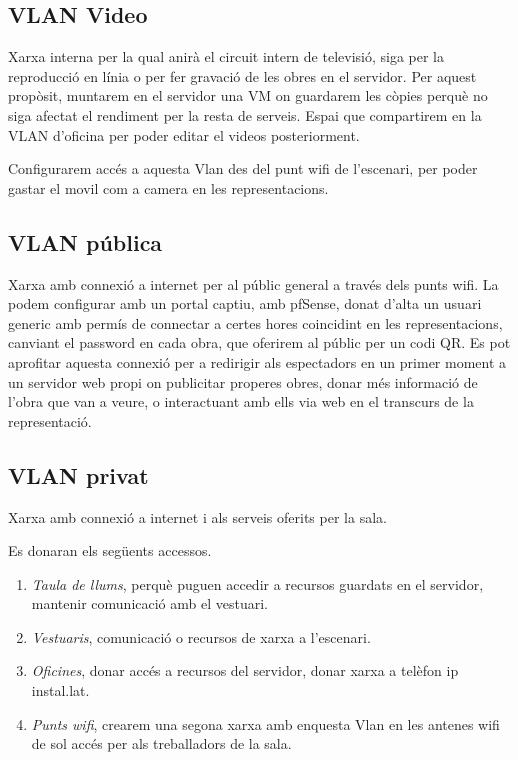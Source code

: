 \documentclass[
  10pt,
]{krantz}
\begin{document}
\hypertarget{vlan-video}{%
\subsection{VLAN Video}\label{vlan-video}}

Xarxa interna per la qual anirà el circuit intern de televisió, siga per la reproducció en línia o per fer gravació de les obres en el servidor. Per aquest propòsit, muntarem en el servidor una VM on guardarem les còpies perquè no siga afectat el rendiment per la resta de serveis. Espai que compartirem en la VLAN d'oficina per poder editar el videos posteriorment.

Configurarem accés a aquesta Vlan des del punt wifi de l'escenari, per poder gastar el movil com a camera en les representacions.

\hypertarget{vlan-puxfablica}{%
\subsection{VLAN pública}\label{vlan-puxfablica}}

Xarxa amb connexió a internet per al públic general a través dels punts wifi. La podem configurar amb un portal captiu, amb pfSense, donat d'alta un usuari generic amb permís de connectar a certes hores coincidint en les representacions, canviant el password en cada obra, que oferirem al públic per un codi QR. Es pot aprofitar aquesta connexió per a redirigir als espectadors en un primer moment a un servidor web propi on publicitar properes obres, donar més informació de l'obra que van a veure, o interactuant amb ells via web en el transcurs de la representació.

\hypertarget{vlan-privat}{%
\subsection{VLAN privat}\label{vlan-privat}}

Xarxa amb connexió a internet i als serveis oferits per la sala.

Es donaran els següents accessos.

\begin{enumerate}
\def\labelenumi{\arabic{enumi}.}
\item
  \emph{Taula de llums}, perquè puguen accedir a recursos guardats en el servidor, mantenir comunicació amb el vestuari.
\item
  \emph{Vestuaris}, comunicació o recursos de xarxa a l'escenari.
\item
  \emph{Oficines}, donar accés a recursos del servidor, donar xarxa a telèfon ip instal.lat.
\item
  \emph{Punts wifi}, crearem una segona xarxa amb enquesta Vlan en les antenes wifi de sol accés per als treballadors de la sala.
\end{enumerate}
\end{document}
